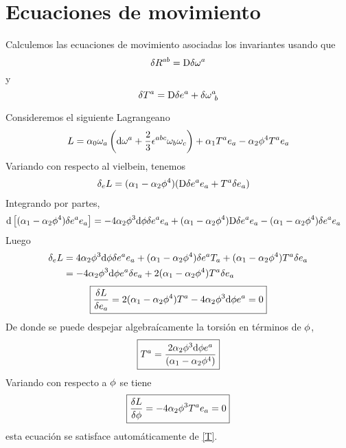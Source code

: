 \section{Ecuaciones de movimiento}
Calculemos las ecuaciones de movimiento asociadas los invariantes usando que
\begin{equation}
  \delta R^{ab}=\mathrm{D} \delta \omega^{a}
\end{equation}
y
\begin{equation}
  \delta T^{a}=\mathrm{D}\delta e^{a}+\delta \omega^{a}_{~b}
\end{equation}


Consideremos el siguiente Lagrangeano
\begin{equation}
  L=\alpha_0\omega_{a}\left(\dd\omega^{a}+\frac{2}{3}\epsilon^{abc}\omega_b\omega_c\right)+\alpha_1T^{a}e_a-\alpha_2\phi^4T^{a}e_a
\end{equation}
Variando con respecto al vielbein, tenemos
\begin{align}
  \delta_eL&=(\alpha_1-\alpha_2\phi^4)(\mathrm{D}\delta e^{a}e_a+T^{a}\delta e_a)
\end{align}
Integrando por partes,\begin{align}
  \dd\left[(\alpha_1-\alpha_2\phi^4)\delta e^{a}e_a\right]&=-4\alpha_2\phi^3\dd\phi \delta e^{a}e_a+(\alpha_1-\alpha_2\phi^4)\mathrm{D}\delta e^{a}e_a-(\alpha_1-\alpha_2\phi^4)\delta e^{a}e_a
\end{align}
Luego
\begin{align}
  \delta_eL&=4\alpha_2\phi^3\dd\phi \delta e^{a}e_a+(\alpha_1-\alpha_2\phi^4)\delta e^{a}T_a+(\alpha_1-\alpha_2\phi^4)T^{a}\delta e_a\\
  &=-4\alpha_2\phi^3\dd\phi e^{a}\delta e_a+2(\alpha_1-\alpha_2\phi^4)T^{a}\delta e_a
\end{align}
\begin{equation}
 \boxed{ \frac{\delta L}{\delta e_a}=2(\alpha_1-\alpha_2\phi^4)T^{a}-4\alpha_2\phi^3\dd\phi e^{a}=0}
\end{equation}
De donde se puede despejar algebraícamente la torsión en términos de $\phi$,
\begin{equation}\label{T}
 \boxed{ T^{a}=\frac{2\alpha_2\phi^3\dd\phi e^{a}}{(\alpha_1-\alpha_2\phi^4)}}
\end{equation}
Variando con respecto a $\phi$ se tiene
\begin{equation}
  \boxed{\frac{\delta L}{\delta \phi }=-4\alpha_2\phi^3 T^{a}e_a=0}
\end{equation}
esta ecuación se satisface automáticamente de \eqref{T}.











